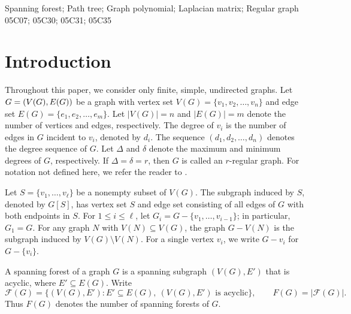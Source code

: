 \documentclass[11pt, a4paper]{article}
\begin{document}
 Spanning forest; Path tree; Graph polynomial; Laplacian matrix; Regular graph\\

 05C07; 05C30; 05C31; 05C35 \\

\section{Introduction}

Throughout this paper, we consider only finite, simple, undirected graphs.
Let $G = (V(G), \\E(G))$ be a graph with vertex set $V(G) = \{v_1, v_2, \dots, v_n\}$
and edge set $E(G) = \{e_1, e_2, \dots, e_m\}$.
Let $|V(G)| = n$ and $|E(G)| = m$ denote the number of vertices and edges, respectively.
The degree of $v_i$ is the number of edges in $G$ incident to $v_i$, denoted by $d_i$.    
The sequence $(d_1, d_2, \dots, d_n)$ denotes the degree sequence of $G$.
Let $\Delta$ and $\delta$ denote the maximum and minimum degrees of $G$, respectively.
If $\Delta = \delta = r$, then $G$ is called an $r$-regular graph.
For notation not defined here, we refer the reader to \cite{Diestel2017}.




Let $S=\{v_1, \ldots, v_\ell\}$ be a nonempty subset of $V(G)$.
The subgraph induced by $S$, denoted by $G[S]$, has vertex set $S$ and edge set consisting of all edges of $G$ with both endpoints in $S$.
For $1 \leq i \leq \ell$, let $G_i = G - \{v_1, \ldots, v_{i-1}\}$; in particular, $G_1 = G$.
For any graph $N$ with $V(N) \subseteq V(G)$, the graph $G - V(N)$ is the subgraph induced by $V(G) \setminus V(N)$. For a single vertex $v_i$, we write $G - v_i$ for $G - \{v_i\}$.








A spanning forest of a graph \(G\) is a spanning subgraph \((V(G),E')\) that is acyclic, where \(E'\subseteq E(G)\). Write
\[
\mathcal{F}(G)=
\{(V(G),E'):E'\subseteq E(G),\ (V(G),E')\text{ is acyclic}\},
\qquad F(G)=|\mathcal{F}(G)|.
\]
Thus $F(G)$ denotes the number of spanning forests of $G$.
\end{document}
